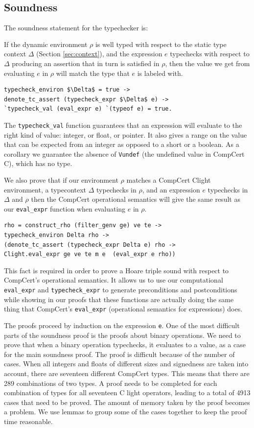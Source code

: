 \documentclass{puthesis}
\begin{document}
 
\subsection{Soundness}
\label{sec:tc_sound}
The soundness statement for the typechecker is:

If the dynamic environment $\rho$ is well typed with respect to the
static type context $\Delta$ (Section \ref{sec:context}), and the
expression $e$ typechecks with respect to $\Delta$ producing an
assertion that in turn is satisfied in $\rho$, then the value we get
from evaluating $e$ in $\rho$ will match the type that $e$ is labeled
with.

\begin{lstlisting}
typecheck_environ $\Delta$ = true -> 
denote_tc_assert (typecheck_expr $\Delta$ e) ->
`typecheck_val (eval_expr e) `(typeof e) = true.
\end{lstlisting} 

The \lstinline|typecheck_val| function guarantees that an expression
will evaluate to the right kind of value: integer, or float, or
pointer. It also gives a range on the value that can be expected from
an integer as opposed to a short or a boolean.  As a corollary we
guarantee the absence of \lstinline|Vundef| (the undefined value in
CompCert C), which has no type.

We also prove that if our environment $\rho$ matches a CompCert Clight
environment, a typecontext $\Delta$ typechecks in $\rho$, and an expression
$e$ typechecks in $\Delta$ and $\rho$ then the CompCert operational semantics
will give the same result as our \lstinline|eval_expr| function when
evaluating $e$ in $\rho$. 

\begin{lstlisting}
rho = construct_rho (filter_genv ge) ve te ->
typecheck_environ Delta rho ->
(denote_tc_assert (typecheck_expr Delta e) rho ->
Clight.eval_expr ge ve te m e  (eval_expr e rho))
\end{lstlisting}

This fact is required in order to prove a Hoare triple sound with
respect to CompCert's operational semantics. It allows us to use our
computational \lstinline|eval_expr| and \lstinline|typecheck_expr| to
generate preconditions and postconditions while showing in our proofs
that these functions are actually doing the same thing that CompCert's
\lstinline|eval_expr| (operational semantics for expressions) does.

The proofs proceed by induction on the expression \lstinline|e|. One
of the most difficult parts of the soundness proof is the proofs about
binary operations. We need to prove that when a binary operation
typechecks, it evaluates to a value, as a case for the main soundness
proof. The proof is difficult because of the number of cases. When all
integers and floats of different sizes and signedness are taken into
account, there are seventeen different CompCert types. This means that
there are 289 combinations of two types. A proof needs to be completed
for each combination of types for all seventeen C light operators,
leading to a total of 4913 cases that need to be proved.  The amount
of memory taken by the proof becomes a problem. We use lemmas to group
some of the cases together to keep the proof time reasonable.
\end{document}
